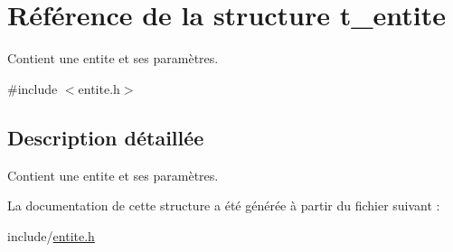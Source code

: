 \hypertarget{structt__entite}{}\section{Référence de la structure t\+\_\+entite}
\label{structt__entite}


Contient une entite et ses paramètres.  




{\ttfamily \#include $<$entite.\+h$>$}



\subsection{Description détaillée}
Contient une entite et ses paramètres. 

La documentation de cette structure a été générée à partir du fichier suivant \+:\begin{DoxyCompactItemize}
\item 
include/\hyperlink{entite_8h}{entite.\+h}\end{DoxyCompactItemize}
